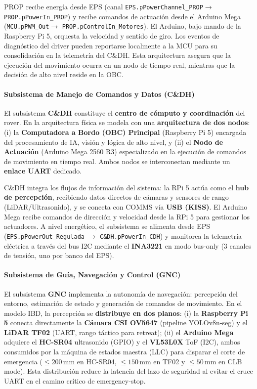 PROP recibe energía desde EPS (canal \texttt{EPS.\allowbreak pPowerChannel\_\allowbreak PROP}\linebreak[0] $\rightarrow$ \texttt{PROP.\allowbreak pPowerIn\_PROP}) y recibe comandos de actuación desde el Arduino Mega (\texttt{MCU.\allowbreak pPWM\_Out}\linebreak[0] $\rightarrow$ \texttt{PROP.\allowbreak pControlIn\_\allowbreak Motores}). El Arduino, bajo mando de la Raspberry Pi 5, orquesta la velocidad y sentido de giro. Los eventos de diagnóstico del driver pueden reportarse localmente a la MCU para su consolidación en la telemetría del C\&DH. Esta arquitectura asegura que la ejecución del movimiento ocurra en un nodo de tiempo real, mientras que la decisión de alto nivel reside en la OBC.

\paragraph{Subsistema de Manejo de Comandos y Datos (C\&DH)}
El subsistema \textbf{C\&DH} constituye el \textbf{centro de cómputo y coordinación} del rover. En la arquitectura física se modela con una \textbf{arquitectura de dos nodos}: (i) la \textbf{Computadora a Bordo (OBC) Principal} (Raspberry Pi 5) encargada del procesamiento de IA, visión y lógica de alto nivel, y (ii) el \textbf{Nodo de Actuación} (Arduino Mega 2560 R3) especializado en la ejecución de comandos de movimiento en tiempo real. Ambos nodos se interconectan mediante un \textbf{enlace UART} dedicado.

C\&DH integra los flujos de información del sistema: la RPi 5 actúa como el \textbf{hub de percepción}, recibiendo datos directos de cámaras y sensores de rango (LiDAR/Ultrasonido), y se conecta con COMMS vía \textbf{USB (KISS)}. El Arduino Mega recibe comandos de dirección y velocidad desde la RPi 5 para gestionar los actuadores. A nivel energético, el subsistema se alimenta desde EPS (\texttt{EPS.pPowerOut\_Regulada} $\rightarrow$ \texttt{C\&DH.pPowerIn\_CDH}) y monitorea la telemetría eléctrica a través del bus I2C mediante el \textbf{INA3221} en modo bus-only (3 canales de tensión, uno por banco del EPS).

\paragraph{Subsistema de Guía, Navegación y Control (GNC)}
El subsistema \textbf{GNC} implementa la autonomía de navegación: percepción del entorno, estimación de estado y generación de comandos de movimiento. En el modelo IBD, la percepción se \textbf{distribuye en dos planos}: (i) la \textbf{Raspberry Pi 5} conecta directamente la \textbf{Cámara CSI OV5647} (pipeline YOLOv8n-seg) y el \textbf{LiDAR TF02} (UART, rango táctico para retreat); (ii) el \textbf{Arduino Mega} adquiere el \textbf{HC-SR04} ultrasonido (GPIO) y el \textbf{VL53L0X} ToF (I2C), ambos consumidos por la máquina de estados maestra (LLC) para disparar el corte de emergencia ($\le 200$\,mm en HC-SR04, $\le 150$\,mm en TF02 y $\le 50$\,mm en CLB mode). Esta distribución reduce la latencia del lazo de seguridad al evitar el cruce UART en el camino crítico de emergency-stop.

